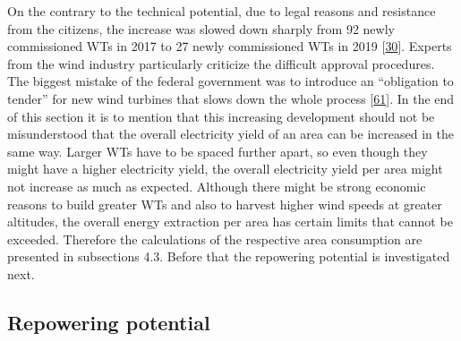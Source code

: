\documentclass[a4paper,11pt]{article}
\begin{document}
On the contrary to the technical potential, due to legal reasons and resistance from the citizens, the increase was slowed down sharply from 92 newly commissioned WTs in 2017 to 27 newly commissioned WTs in 2019 {[}\protect\hyperlink{ref-EnergieagenturRheinlandPfalz.2019}{30}{]}. Experts from the wind industry particularly criticize the difficult approval procedures. The biggest mistake of the federal government was to introduce an ``obligation to tender'' for new wind turbines that slows down the whole process {[}\protect\hyperlink{ref-NickSchader.2021}{61}{]}. In the end of this section it is to mention that this increasing development should not be misunderstood that the overall electricity yield of an area can be increased in the same way. Larger WTs have to be spaced further apart, so even though they might have a higher electricity yield, the overall electricity yield per area might not increase as much as expected. Although there might be strong economic reasons to build greater WTs and also to harvest higher wind speeds at greater altitudes, the overall energy extraction per area has certain limits that cannot be exceeded. Therefore the calculations of the respective area consumption are presented in subsections 4.3. Before that the repowering potential is investigated next.

\hypertarget{repowering-potential}{%
\subsection{Repowering potential}\label{repowering-potential}}
\end{document}
